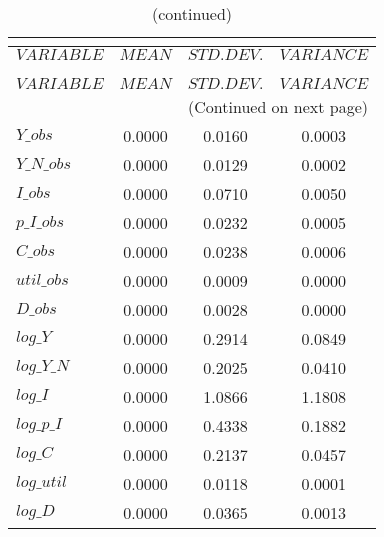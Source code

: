  
\begin{center}
\begin{longtable}{lccc} 
\caption{THEORETICAL MOMENTS}\\
 \label{Table:th_moments}\\
\toprule 
$VARIABLE   $	 & 	 $         MEAN$	 & 	 $    STD. DEV.$	 & 	 $     VARIANCE$\\
\midrule \endfirsthead 
\caption{(continued)}\\
 \toprule \\ 
$VARIABLE   $	 & 	 $         MEAN$	 & 	 $    STD. DEV.$	 & 	 $     VARIANCE$\\
\midrule \endhead 
\midrule \multicolumn{4}{r}{(Continued on next page)} \\ \bottomrule \endfoot 
\bottomrule \endlastfoot 
$Y\_obs     $	 & 	       0.0000	 & 	       0.0160	 & 	       0.0003 \\ 
$Y\_N\_obs  $	 & 	       0.0000	 & 	       0.0129	 & 	       0.0002 \\ 
$I\_obs     $	 & 	       0.0000	 & 	       0.0710	 & 	       0.0050 \\ 
$p\_I\_obs  $	 & 	       0.0000	 & 	       0.0232	 & 	       0.0005 \\ 
$C\_obs     $	 & 	       0.0000	 & 	       0.0238	 & 	       0.0006 \\ 
$util\_obs  $	 & 	       0.0000	 & 	       0.0009	 & 	       0.0000 \\ 
$D\_obs     $	 & 	       0.0000	 & 	       0.0028	 & 	       0.0000 \\ 
$log\_Y     $	 & 	       0.0000	 & 	       0.2914	 & 	       0.0849 \\ 
$log\_Y\_N  $	 & 	       0.0000	 & 	       0.2025	 & 	       0.0410 \\ 
$log\_I     $	 & 	       0.0000	 & 	       1.0866	 & 	       1.1808 \\ 
$log\_p\_I  $	 & 	       0.0000	 & 	       0.4338	 & 	       0.1882 \\ 
$log\_C     $	 & 	       0.0000	 & 	       0.2137	 & 	       0.0457 \\ 
$log\_util  $	 & 	       0.0000	 & 	       0.0118	 & 	       0.0001 \\ 
$log\_D     $	 & 	       0.0000	 & 	       0.0365	 & 	       0.0013 \\ 
\end{longtable}
 \end{center}
